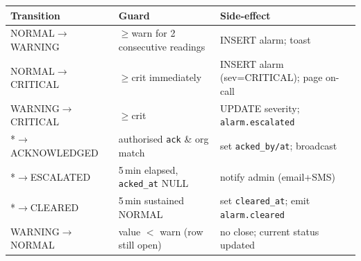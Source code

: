 \begin{center}
\renewcommand{\arraystretch}{1.18}\small
\begin{tabularx}{\textwidth}{@{}l l X@{}}
\toprule
\textbf{Transition} & \textbf{Guard} & \textbf{Side-effect} \\
\midrule
NORMAL$\to$WARNING & $\geq$warn for 2 consecutive readings & INSERT alarm; toast \\
NORMAL$\to$CRITICAL & $\geq$crit immediately & INSERT alarm (sev=CRITICAL); page on-call \\
WARNING$\to$CRITICAL & $\geq$crit & UPDATE severity; \texttt{alarm.escalated} \\
*$\to$ACKNOWLEDGED & authorised \texttt{ack} \& org match & set \texttt{acked\_by/at}; broadcast \\
*$\to$ESCALATED & 5\,min elapsed, \texttt{acked\_at} NULL & notify admin (email+SMS) \\
*$\to$CLEARED & 5\,min sustained NORMAL & set \texttt{cleared\_at}; emit \texttt{alarm.cleared} \\
WARNING$\to$NORMAL & value $<$ warn (row still open) & no close; current status updated \\
\bottomrule
\end{tabularx}
\end{center}

